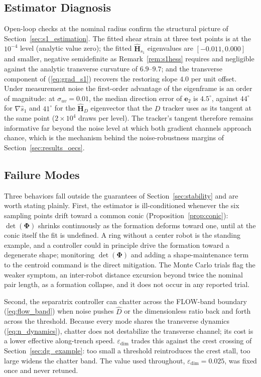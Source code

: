 \documentclass[lettersize,journal]{IEEEtran}
\begin{document}
\subsection{Estimator Diagnosis}
\label{sec:estimator_diagnosis}

Open-loop checks at the nominal radius confirm the structural picture
of Section~\ref{sec:s1_estimation}. The fitted shear strain at three
test points is at the $10^{-4}$ level (analytic value zero); the fitted
$\hat{\mathbf{H}}_{s_1}$ eigenvalues are $[-0.011, 0.000]$ and smaller,
negative semidefinite as Remark~\ref{rem:s1hess} requires and
negligible against the analytic transverse curvature of $6.9$--$9.7$;
and the transverse component of (\ref{eq:grad_s1}) recovers the
restoring slope $4.0$ per unit offset. Under measurement noise the
first-order advantage of the eigenframe is an order of magnitude: at
$\sigma_{uv} = 0.01$, the median direction error of $\mathbf{e}_2$ is
$4.5^\circ$, against $44^\circ$ for $\nabla\hat{s}_1$ and $41^\circ$
for the $\hat{\mathbf{H}}_D$ eigenvector that the $D$ tracker uses as its
tangent at the same point ($2\times 10^4$ draws per level). The
tracker's tangent therefore remains informative far beyond the noise
level at which both gradient channels approach chance, which is the
mechanism behind the noise-robustness margins of
Section~\ref{sec:results_oecs}.

\subsection{Failure Modes}

Three behaviors fall outside the guarantees of
Section~\ref{sec:stability} and are worth stating plainly. First, the
estimator is ill-conditioned whenever the six sampling points drift
toward a common conic (Proposition~\ref{prop:conic}):
$\det(\boldsymbol{\Phi})$ shrinks continuously as the formation
deforms toward one, until at the conic itself the fit is undefined. A
ring without a center robot is the standing example, and a controller
could in principle drive the formation toward a degenerate shape;
monitoring $\det(\boldsymbol{\Phi})$ and adding a shape-maintenance
term to the centroid command is the direct mitigation. The Monte Carlo
trials flag the weaker symptom, an inter-robot distance excursion
beyond twice the nominal pair length, as a formation collapse, and it
does not occur in any reported trial.

Second, the separatrix controller can chatter across the FLOW-band
boundary (\ref{eq:flow_band}) when noise pushes $\hat{D}$ or the
dimensionless ratio back and forth across the threshold. Because every
mode shares the transverse dynamics (\ref{eq:n_dynamics}), chatter
does not destabilize the transverse channel; its cost is a lower
effective along-trench speed. $\varepsilon_{\text{dim}}$ trades this
against the crest crossing of Section~\ref{sec:dg_example}: too small
a threshold reintroduces the crest stall, too large widens the chatter
band. The value used throughout, $\varepsilon_{\text{dim}} = 0.025$,
was fixed once and never retuned.
\end{document}
